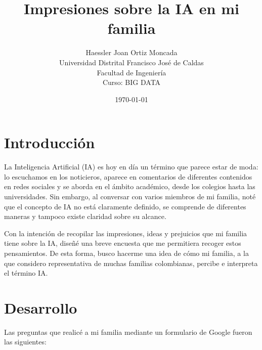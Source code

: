 \documentclass[12pt,a4paper]{article}
\title{\textbf{Impresiones sobre la IA en mi familia}}
\author{Haessler Joan Ortiz Moncada \\[0.5cm]
        Universidad Distrital Francisco José de Caldas \\
        Facultad de Ingeniería \\
        Curso: BIG DATA}
\date{\today}
\begin{document}
\maketitle

\section*{Introducción}
La Inteligencia Artificial (IA) es hoy en día un término que parece estar de moda: lo escuchamos en los noticieros, 
aparece en comentarios de diferentes contenidos en redes sociales y se aborda en el ámbito académico, 
desde los colegios hasta las universidades. Sin embargo, al conversar con varios miembros de mi familia, noté que el 
concepto de IA no está claramente definido, se comprende de diferentes maneras y tampoco existe claridad sobre su alcance.

Con la intención de recopilar las impresiones, ideas y prejuicios que mi familia tiene sobre la IA, diseñé una breve 
encuesta que me permitiera recoger estos pensamientos. De esta forma, busco hacerme una idea de cómo mi familia, 
a la que considero representativa de muchas familias colombianas, percibe e interpreta el término IA.

\section*{Desarrollo}
Las preguntas que realicé a mi familia mediante un formulario de Google fueron las siguientes:
\end{document}
